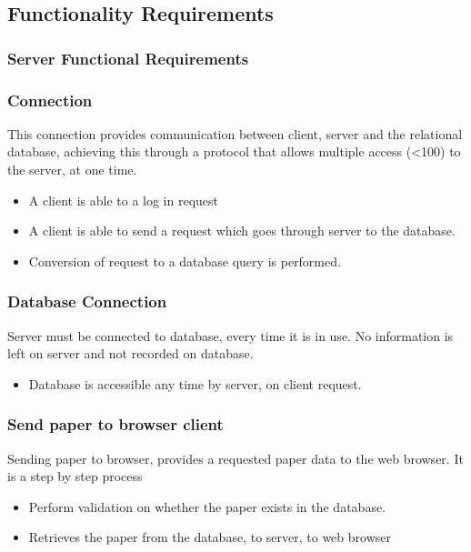 \documentclass[hidelinks,a4paper,12pt]{article}
\begin{document}
	\subsection{Functionality Requirements}
	\subsubsection{Server Functional Requirements}
	
	\subsubsection{Connection}
	
	This connection provides communication between client, server     
	and the relational database, achieving this through a 	protocol 
	that allows multiple access (<100) to the server, at 	one time.
	\begin{itemize}
		\item A client is able to a log in request 
		
		\item A client is able to send a request which goes through server 	to the database.
		
		\item Conversion of request to a database query is performed.      	
	\end{itemize}
	
	\subsubsection{Database Connection}
	
	Server must be connected to database, every time it is in use. 
	No information is left on server and not recorded on database.  
	
	\begin{itemize}
			\item Database is accessible any time by server, on client request. 
	\end{itemize}
	
	
		\subsubsection{Send paper to browser client}
	
	Sending paper to browser, provides a requested paper data to the  
	web browser. It is a step by step process
	
	\begin{itemize}
	\item Perform validation on whether the paper exists in the database.
	\item Retrieves the paper from the database, to server, to web browser
\end{itemize}
	
\end{document}
